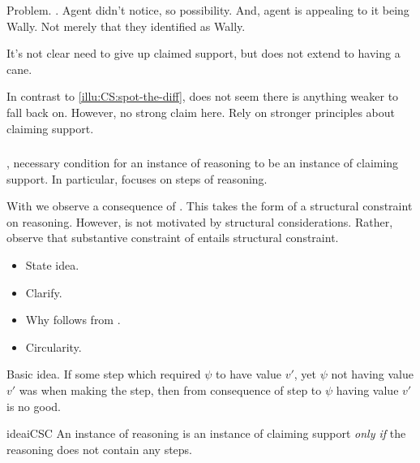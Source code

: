 \begin{note}
  Problem.
  \requ{}.
  Agent didn't notice, so possibility.
  And, agent is appealing to it being Wally.
  Not merely that they identified as Wally.

  It's not clear need to give up claimed support, but does not extend to having a cane.

  In contrast to \ref{illu:CS:spot-the-diff}, does not seem there is anything weaker to fall back on.
  However, no strong claim here.
  Rely on stronger principles about claiming support.
\end{note}




\subsubsection{}
\label{sec:ideaCSC}

\begin{note}
  \ideaCS{}, necessary condition for an instance of reasoning to be an instance of claiming support.
  In particular, \ideaCS{} focuses on steps of reasoning.

  With \ideaCSC{} we observe a consequence of \ideaCS{}.
  This takes the form of a structural constraint on reasoning.
  However, \ideaCSC{} is not motivated by structural considerations.
  Rather, observe that substantive constraint of \ideaCS{} entails structural constraint.
\end{note}

\begin{note}
  \begin{itemize}
  \item State idea.
  \item Clarify.
  \item Why follows from \ideaCS{}.
  \item Circularity.
  \end{itemize}
\end{note}

\begin{note}
  Basic idea.
  If some step which required \(\psi\) to have value \(v'\), yet \(\psi\) not having value \(v'\) was \epVAd{} when making the step, then from consequence of step to \(\psi\) having value \(v'\) is no good.
\end{note}

\begin{note}
  \begin{restatable}{idea}{iCSC}
    \label{idea:cs:imp-stp}
    An instance of reasoning is an instance of claiming support \emph{only if} the reasoning does not contain any  steps.
  \end{restatable}
\end{note}

